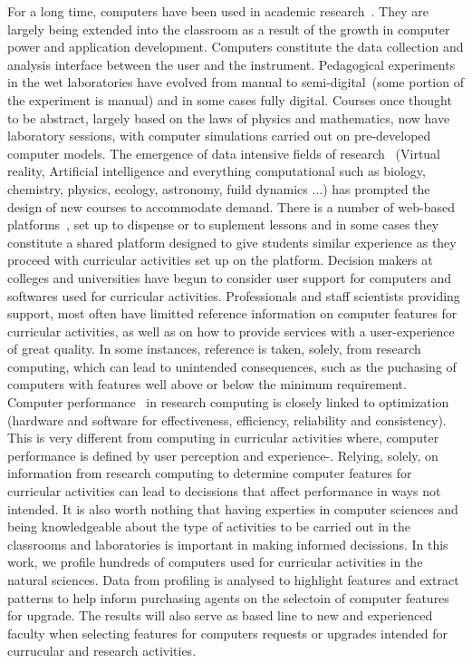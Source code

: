 For a long time, computers have been used in academic research~\cite{KemalA2008}. They are largely being 
extended into the classroom as a result of the growth in computer power and application 
development. Computers constitute the data collection and analysis interface between the 
user and the instrument. Pedagogical experiments in the wet laboratories have evolved 
from manual to semi-digital~(some portion of the experiment is manual) and in some cases 
fully digital. Courses once thought to be abstract, largely based on the laws of physics 
and mathematics, now have laboratory sessions, with computer simulations carried out on 
pre-developed computer models. The emergence of data intensive fields of research~\cite{TenopirC2015,CarolTenopir2014} 
(Virtual reality, Artificial intelligence and everything computational such as biology, 
chemistry, physics, ecology, astronomy, fuild dynamics ${\ldots}$) has prompted the design
of new courses to accommodate demand. There is a number of web-based platforms~\cite{pearson,hawkes}, set up to 
dispense or to suplement lessons and in some cases they constitute a shared platform designed 
to give students similar experience as they proceed with curricular activities set up on the 
platform. Decision makers at colleges and universities have begun to consider user 
support for computers and softwares used for curricular activities. Professionals and staff 
scientists providing support, most often have limitted reference information on computer features 
for curricular activities, as well as on how to provide services with a user-experience~\cite{WilliamJD1988} 
of great quality. In some instances, reference is taken, solely, from research computing, which 
can lead to unintended consequences, such as the puchasing of computers with features well 
above or below the minimum requirement. Computer performance~\cite{LiljaJD2004} in research computing is 
closely linked to optimization (hardware and software for effectiveness, efficiency, reliability and 
consistency). This is very different from computing in curricular activities where, computer 
performance is defined by user perception and experience-\cite{FlautnerK2000}. Relying, solely, on 
information from research computing to determine computer features for curricular activities can 
lead to decissions that affect performance in ways not intended. It is also worth nothing that 
having experties in computer sciences and being knowledgeable about the type of activities 
to be carried out in the classrooms and laboratories is important in making informed 
decissions. In this work, we profile hundreds of computers used for curricular activities 
in the natural sciences. Data from profiling is analysed to highlight features and extract 
patterns to help inform purchasing agents on the selectoin of computer features for upgrade. 
The results will also serve as based line to new and experienced faculty when selecting 
features for computers requests or upgrades intended for currucular and research activities.
